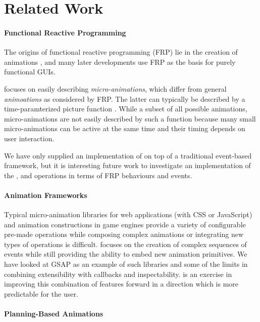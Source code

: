 \section{Related Work}
\label{sec:related}

\paragraph{Functional Reactive Programming}
The origins of functional reactive programming (FRP) lie in the creation of
animations \cite{DBLP:conf/icfp/ElliottH97}, and many later developments use
FRP as the basis for purely functional GUIs. 

\dsl{} focuses on easily describing \emph{micro-animations}, which differ from general
\emph{animoations} as considered by FRP. The latter can typically be described
by a time-paramterized picture function . While a subset of
all possible animations, micro-animations are not easily described by such a
function because many small micro-animations can be active at the same time and
their timing depends on user interaction.

We have only supplied an implementation of \dsl{} on top of a traditional
event-based framework, but it is interesting future work to investigate an
implementation of the ,  and 
operations in terms of FRP behaviours and events.

\paragraph{Animation Frameworks}

Typical micro-animation libraries for web applications (with CSS or JavaScript)
and animation constructions in game engines provide a variety of configurable
pre-made operations while composing complex animations or integrating new types
of operations is difficult. \dsl{} focuses on the creation of complex sequences
of events while still providing the ability to embed new animation primitives.
We have looked at GSAP as an example of such libraries and some of the limits
in combining extensibility with callbacks and inspectability. \dsl{} is an
exercise in improving this combination of features forward in a direction which
is more predictable for the user.

\paragraph{Planning-Based Animations}

